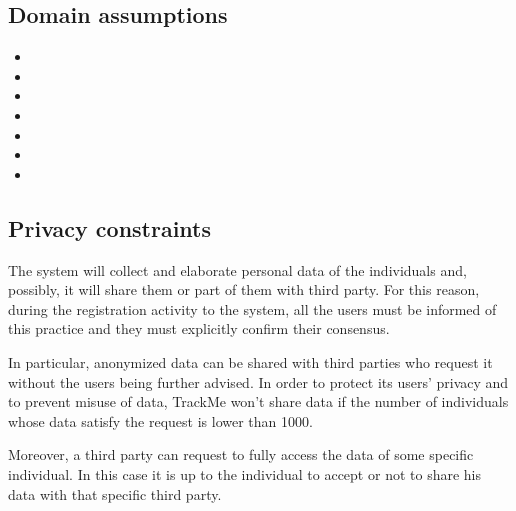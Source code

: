 \subsection{Domain assumptions}

\begin{itemize}


\item[]  
\item[]
\item[]
\item[]
\item[]
\item[]
\item[]
\end{itemize}




\subsection{Privacy constraints}
The system will collect and elaborate personal data of the individuals and, possibly, it will share them or part of them with third party.  For this reason, during the registration activity to the system, all the users must be informed of this practice and they must explicitly confirm their consensus.

In particular, anonymized data can be shared with third parties who request it without the users being further advised. In order to protect its users' privacy and to prevent misuse of data, TrackMe won't share data if the number of individuals whose data satisfy the request is lower than 1000.

Moreover, a third party can request to fully access the data of some specific individual. In this case it is up to the individual to accept or not to share his data with that specific third party.


